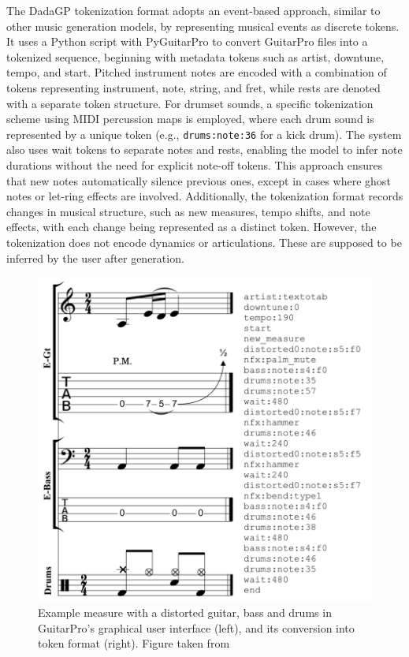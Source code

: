 The DadaGP tokenization format adopts an event-based approach, similar to other music generation models, by representing musical events as discrete tokens.
It uses a Python script with PyGuitarPro\cite{abakumov_pyguitarpro_2014} to convert GuitarPro files into a tokenized sequence, beginning with metadata tokens such as artist, downtune, tempo, and start.
Pitched instrument notes are encoded with a combination of tokens representing instrument, note, string, and fret, while rests are denoted with a separate token structure.
For drumset sounds, a specific tokenization scheme using MIDI percussion maps is employed, where each drum sound is represented by a unique token (e.g., \texttt{drums:note:36} for a kick drum).
The system also uses wait tokens to separate notes and rests, enabling the model to infer note durations without the need for explicit note-off tokens.
This approach ensures that new notes automatically silence previous ones, except in cases where ghost notes or let-ring effects are involved.
Additionally, the tokenization format records changes in musical structure, such as new measures, tempo shifts, and note effects, with each change being represented as a distinct token.
However, the tokenization does not encode dynamics or articulations. These are supposed to be inferred by the user after generation.


\begin{figure}[!ht]
    \centering
    \includegraphics[width=.43\linewidth]{../images-figures/dadagp_tokenization_example_measure.png}
    \caption{Example measure with a distorted guitar, bass and drums in GuitarPro’s graphical user interface (left), and its conversion into token format (right). Figure taken from \cite{sarmento_dadagp_2021}}
    \label{fig:dadagp_tokenization}
\end{figure}


